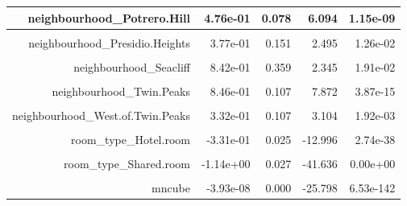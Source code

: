 \documentclass[justified, 11pt]{scrartcl}\usepackage[]{graphicx}\usepackage[]{xcolor}
\newenvironment{knitrout}{}{} %
\begin{document}
\begin{knitrout}
\begin{table}
\begin{tabular}{r|r|r|r|r}
\hline
neighbourhood\_Potrero.Hill & 4.76e-01 & 0.078 & 6.094 & 1.15e-09\\
\hline
\cellcolor{gray!6}{neighbourhood\_Presidio} & \cellcolor{gray!6}{4.95e-01} & \cellcolor{gray!6}{0.290} & \cellcolor{gray!6}{1.707} & \cellcolor{gray!6}{8.79e-02}\\
\hline
neighbourhood\_Presidio.Heights & 3.77e-01 & 0.151 & 2.495 & 1.26e-02\\
\hline
\cellcolor{gray!6}{neighbourhood\_Russian.Hill} & \cellcolor{gray!6}{4.83e-01} & \cellcolor{gray!6}{0.122} & \cellcolor{gray!6}{3.967} & \cellcolor{gray!6}{7.33e-05}\\
\hline
neighbourhood\_Seacliff & 8.42e-01 & 0.359 & 2.345 & 1.91e-02\\
\hline
\cellcolor{gray!6}{neighbourhood\_South.of.Market} & \cellcolor{gray!6}{3.36e-01} & \cellcolor{gray!6}{0.086} & \cellcolor{gray!6}{3.926} & \cellcolor{gray!6}{8.69e-05}\\
\hline
neighbourhood\_Twin.Peaks & 8.46e-01 & 0.107 & 7.872 & 3.87e-15\\
\hline
\cellcolor{gray!6}{neighbourhood\_Visitacion.Valley} & \cellcolor{gray!6}{2.63e-01} & \cellcolor{gray!6}{0.092} & \cellcolor{gray!6}{2.877} & \cellcolor{gray!6}{4.03e-03}\\
\hline
neighbourhood\_West.of.Twin.Peaks & 3.32e-01 & 0.107 & 3.104 & 1.92e-03\\
\hline
\cellcolor{gray!6}{neighbourhood\_Western.Addition} & \cellcolor{gray!6}{4.15e-01} & \cellcolor{gray!6}{0.097} & \cellcolor{gray!6}{4.254} & \cellcolor{gray!6}{2.12e-05}\\
\hline
room\_type\_Hotel.room & -3.31e-01 & 0.025 & -12.996 & 2.74e-38\\
\hline
\cellcolor{gray!6}{room\_type\_Private.room} & \cellcolor{gray!6}{-5.90e-01} & \cellcolor{gray!6}{0.020} & \cellcolor{gray!6}{-29.583} & \cellcolor{gray!6}{4.50e-184}\\
\hline
room\_type\_Shared.room & -1.14e+00 & 0.027 & -41.636 & 0.00e+00\\
\hline
\cellcolor{gray!6}{mnsqd} & \cellcolor{gray!6}{6.00e-05} & \cellcolor{gray!6}{0.000} & \cellcolor{gray!6}{29.849} & \cellcolor{gray!6}{3.24e-187}\\
\hline
mncube & -3.93e-08 & 0.000 & -25.798 & 6.53e-142\\
\hline
\end{tabular}
\endgroup{}
\end{table}

\end{knitrout}
\normalsize

{}

\end{document}

